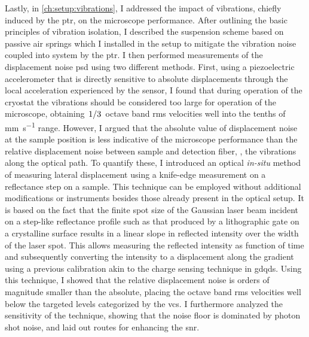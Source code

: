 Lastly, in \cref{ch:setup:vibrations}, I addressed the impact of vibrations, chiefly induced by the \gls{ptr}, on the microscope performance.
After outlining the basic principles of vibration isolation, I described the suspension scheme based on passive air springs which I installed in the setup to mitigate the vibration noise coupled into system by the \gls{ptr}.
I then performed measurements of the displacement noise \gls{psd} using two different methods.
First, using a piezoelectric accelerometer that is directly sensitive to absolute displacements through the local acceleration experienced by the sensor, I found that during operation of the cryostat the vibrations should be considered too large for operation of the microscope, obtaining $\flatfrac{1}{3}$ octave band \gls{rms} velocities well into the tenths of \unit{\milli\meter\per\second} range.
However, I argued that the absolute value of displacement noise at the sample position is less indicative of the microscope performance than the relative displacement noise between sample and detection fiber, \ie, the vibrations along the optical path.
To quantify these, I introduced an optical \emph{in-situ} method of measuring lateral displacement using a knife-edge measurement on a reflectance step on a sample.
This technique can be employed without additional modifications or instruments besides those already present in the optical setup.
It is based on the fact that the finite spot size of the Gaussian laser beam incident on a step-like reflectance profile such as that produced by a lithographic  gate on a crystalline surface results in a linear slope in reflected intensity over the width of the laser spot.
This allows measuring the reflected intensity as function of time and subsequently converting the intensity to a displacement along the gradient using a previous calibration akin to the charge sensing technique in \glspl{gdqd}.
Using this technique, I showed that the relative displacement noise is orders of magnitude smaller than the absolute, placing the octave band \gls{rms} velocities well below the targeted levels categorized by the \glspl{vc}.
I furthermore analyzed the sensitivity of the technique, showing that the noise floor is dominated by photon shot noise, and laid out routes for enhancing the \gls{snr}.

